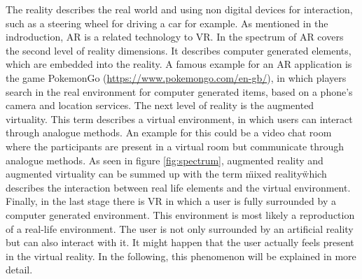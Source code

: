 The reality describes the real world and using non digital devices for interaction, such as a steering wheel for driving a car for example. As mentioned in the indroduction, AR is a related technology to VR. In the spectrum of \cite{Tham.2018} AR covers the second level of reality dimensions. It describes computer generated elements, which are embedded into the reality. A famous example for an AR application is the game PokemonGo (\url{https://www.pokemongo.com/en-gb/}), in which players search in the real environment for computer generated items, based on a phone's camera and location services. The next level of reality is the augmented virtuality. This term describes a virtual environment, in which users can interact through analogue methods. An example for this could be a video chat room where the participants are present in a virtual room but communicate through analogue methods. As seen in figure \ref{fig:spectrum}, augmented reality and augmented virtuality can be summed up with the term \"mixed reality\" which describes the interaction between real life elements and the virtual environment. Finally, in the last stage there is VR in which a user is fully surrounded by a computer generated environment. This environment is most likely a reproduction of a real-life environment. The user is not only surrounded by an artificial reality but can also interact with it. It might happen that the user actually feels present in the virtual reality. In the following, this phenomenon will be explained in more detail.

\newpage
